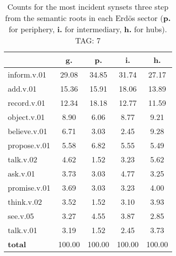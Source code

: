 \begin{table}[h!]
\begin{center}
\begin{tabular}{| l || c | c | c | c |}\hline
 & {\bf g.} & {\bf p.} & {\bf i.} & {\bf h.} \\\hline\hline
inform.v.01 & 29.08  & 34.85  & 31.74  & 27.17 \\\hline
add.v.01 & 15.36  & 15.91  & 18.06  & 13.89 \\\hline
record.v.01 & 12.34  & 18.18  & 12.77  & 11.59 \\\hline
object.v.01 & 8.90  & 6.06  & 8.77  & 9.21 \\\hline
believe.v.01 & 6.71  & 3.03  & 2.45  & 9.28 \\\hline
propose.v.01 & 5.58  & 6.82  & 5.55  & 5.49 \\\hline
talk.v.02 & 4.62  & 1.52  & 3.23  & 5.62 \\\hline
ask.v.01 & 3.73  & 3.03  & 4.77  & 3.25 \\\hline
promise.v.01 & 3.69  & 3.03  & 3.23  & 4.00 \\\hline
think.v.02 & 3.52  & 1.52  & 3.10  & 3.93 \\\hline
see.v.05 & 3.27  & 4.55  & 3.87  & 2.85 \\\hline
talk.v.01 & 3.19  & 1.52  & 2.45  & 3.73 \\\hline\hline
{{\bf total}} & 100.00  & 100.00  & 100.00  & 100.00 \\\hline
\end{tabular}
\caption{Counts for the most incident synsets three step from the semantic roots in each Erd\"os sector ({\bf p.} for periphery, {\bf i.} for intermediary, {\bf h.} for hubs). TAG: 7}
\end{center}
\end{table}